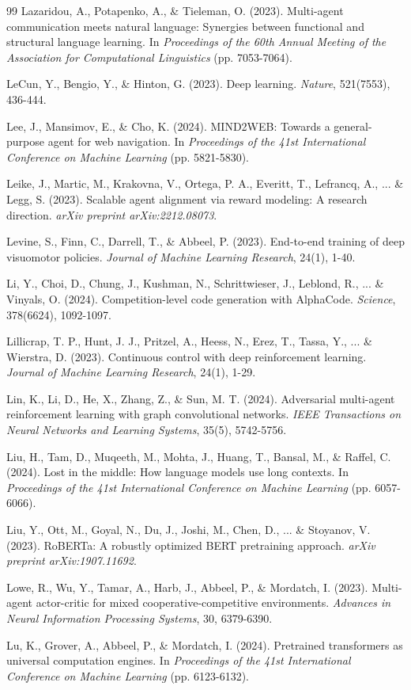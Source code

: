 \begin{thebibliography}{99}
Lazaridou, A., Potapenko, A., \& Tieleman, O. (2023). Multi-agent communication meets natural language: Synergies between functional and structural language learning. In \textit{Proceedings of the 60th Annual Meeting of the Association for Computational Linguistics} (pp. 7053-7064).

LeCun, Y., Bengio, Y., \& Hinton, G. (2023). Deep learning. \textit{Nature}, 521(7553), 436-444.

Lee, J., Mansimov, E., \& Cho, K. (2024). MIND2WEB: Towards a general-purpose agent for web navigation. In \textit{Proceedings of the 41st International Conference on Machine Learning} (pp. 5821-5830).

Leike, J., Martic, M., Krakovna, V., Ortega, P. A., Everitt, T., Lefrancq, A., ... \& Legg, S. (2023). Scalable agent alignment via reward modeling: A research direction. \textit{arXiv preprint arXiv:2212.08073}.

Levine, S., Finn, C., Darrell, T., \& Abbeel, P. (2023). End-to-end training of deep visuomotor policies. \textit{Journal of Machine Learning Research}, 24(1), 1-40.

Li, Y., Choi, D., Chung, J., Kushman, N., Schrittwieser, J., Leblond, R., ... \& Vinyals, O. (2024). Competition-level code generation with AlphaCode. \textit{Science}, 378(6624), 1092-1097.

Lillicrap, T. P., Hunt, J. J., Pritzel, A., Heess, N., Erez, T., Tassa, Y., ... \& Wierstra, D. (2023). Continuous control with deep reinforcement learning. \textit{Journal of Machine Learning Research}, 24(1), 1-29.

Lin, K., Li, D., He, X., Zhang, Z., \& Sun, M. T. (2024). Adversarial multi-agent reinforcement learning with graph convolutional networks. \textit{IEEE Transactions on Neural Networks and Learning Systems}, 35(5), 5742-5756.

Liu, H., Tam, D., Muqeeth, M., Mohta, J., Huang, T., Bansal, M., \& Raffel, C. (2024). Lost in the middle: How language models use long contexts. In \textit{Proceedings of the 41st International Conference on Machine Learning} (pp. 6057-6066).

Liu, Y., Ott, M., Goyal, N., Du, J., Joshi, M., Chen, D., ... \& Stoyanov, V. (2023). RoBERTa: A robustly optimized BERT pretraining approach. \textit{arXiv preprint arXiv:1907.11692}.

Lowe, R., Wu, Y., Tamar, A., Harb, J., Abbeel, P., \& Mordatch, I. (2023). Multi-agent actor-critic for mixed cooperative-competitive environments. \textit{Advances in Neural Information Processing Systems}, 30, 6379-6390.

Lu, K., Grover, A., Abbeel, P., \& Mordatch, I. (2024). Pretrained transformers as universal computation engines. In \textit{Proceedings of the 41st International Conference on Machine Learning} (pp. 6123-6132).

\end{thebibliography}
